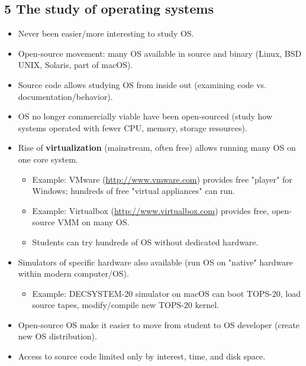 \documentclass{article}
\begin{document}
\subsection*{5 The study of operating systems}
\begin{itemize}
    \item Never been easier/more interesting to study OS.
    \item Open-source movement: many OS available in source and binary (Linux, BSD UNIX, Solaris, part of macOS).
    \item Source code allows studying OS from inside out (examining code vs. documentation/behavior).
    \item OS no longer commercially viable have been open-sourced (study how systems operated with fewer CPU, memory, storage resources).
    \item Rise of \textbf{virtualization} (mainstream, often free) allows running many OS on one core system.
    \begin{itemize}
        \item Example: VMware (\url{http://www.vmware.com}) provides free "player" for Windows; hundreds of free "virtual appliances" can run.
        \item Example: Virtualbox (\url{http://www.virtualbox.com}) provides free, open-source VMM on many OS.
        \item Students can try hundreds of OS without dedicated hardware.
    \end{itemize}
    \item Simulators of specific hardware also available (run OS on "native" hardware within modern computer/OS).
    \begin{itemize}
        \item Example: DECSYSTEM-20 simulator on macOS can boot TOPS-20, load source tapes, modify/compile new TOPS-20 kernel.
    \end{itemize}
    \item Open-source OS make it easier to move from student to OS developer (create new OS distribution).
    \item Access to source code limited only by interest, time, and disk space.
\end{itemize}
\end{document}
